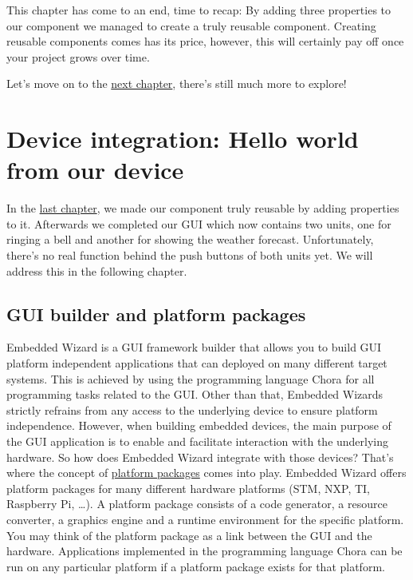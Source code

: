 \documentclass[
  a4paper,
,tablecaptionabove
]{scrbook}
\begin{document}
This chapter has come to an end, time to recap: By adding three
properties to our component we managed to create a truly reusable
component. Creating reusable components comes has its price, however,
this will certainly pay off once your project grows over time.

Let's move on to the \href{:DeviceIntegrationBrowser.xml}{next chapter},
there's still much more to explore!

\chapter{Device integration: Hello world from our device}


In the \href{:ComponentReusability.xml}{last chapter}, we made our
component truly reusable by adding properties to it. Afterwards we
completed our GUI which now contains two units, one for ringing a bell
and another for showing the weather forecast. Unfortunately, there's no
real function behind the push buttons of both units yet. We will address
this in the following chapter.

\hypertarget{_gui_builder_and_platform_packages}{%
\section{GUI builder and platform packages}\label{_gui_builder_and_platform_packages}}

Embedded Wizard is a GUI framework builder that allows you to build GUI
platform independent applications that can deployed on many different
target systems. This is achieved by using the programming language Chora
for all programming tasks related to the GUI. Other than that, Embedded
Wizards strictly refrains from any access to the underlying device to
ensure platform independence. However, when building embedded devices,
the main purpose of the GUI application is to enable and facilitate
interaction with the underlying hardware. So how does Embedded Wizard
integrate with those devices? That's where the concept of
\href{https://doc.embedded-wizard.de/platform-package}{platform
packages} comes into play. Embedded Wizard offers platform packages for
many different hardware platforms (STM, NXP, TI, Raspberry Pi, \ldots​).
A platform package consists of a code generator, a resource converter, a
graphics engine and a runtime environment for the specific platform. You
may think of the platform package as a link between the GUI and the
hardware. Applications implemented in the programming language Chora can
be run on any particular platform if a platform package exists for that
platform.
\end{document}
